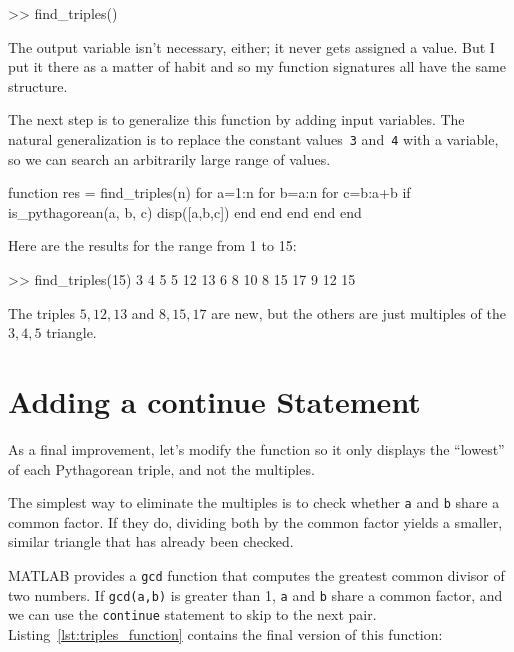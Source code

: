 \documentclass[../../book.tex]{subfiles}
\begin{document}
\begin{code}
>> find_triples()
\end{code}

The output variable isn't necessary, either; it
never gets assigned a value.  But I put it there as a matter of
habit and so my function signatures all have the same structure.


The next step is to generalize this function by adding input
variables.  The natural generalization is to replace the constant
values~\lstinline{3} and~\lstinline{4} with a variable, so we can search an arbitrarily large
range of values.

\begin{code}
function res = find_triples(n)
    for a=1:n
        for b=a:n
            for c=b:a+b
                if is_pythagorean(a, b, c)
                    disp([a,b,c])
                end
            end
        end
    end
end
\end{code}

Here are the results for the range from 1 to 15:

\begin{code}
>> find_triples(15)
     3     4     5
     5    12    13
     6     8    10
     8    15    17
     9    12    15
\end{code}

The triples $5,12,13$ and $8,15,17$ are new, but the others are just multiples of the $3,4,5$ triangle.

\section{Adding a continue Statement}


As a final improvement, let's modify the function so it only
displays the ``lowest'' of each Pythagorean triple, and not the
multiples.

The simplest way to eliminate the multiples is to check whether
\lstinline{a} and \lstinline{b} share a common factor.  If they do, dividing both
by the common factor yields a smaller, similar triangle that has
already been checked.


MATLAB provides a \lstinline{gcd} function that computes the greatest common
divisor of two numbers.  If \lstinline{gcd(a,b)} is greater than 1,
\lstinline{a} and \lstinline{b} share a common factor, and we can use the \lstinline{continue}
statement to skip to the next pair. Listing~\ref{lst:triples_function} contains the final version of this function:
\end{document}
